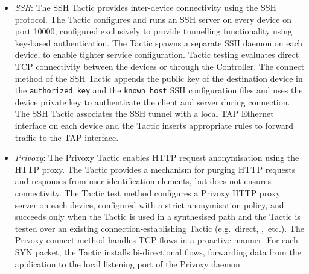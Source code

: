 \begin{itemize}
  \item \emph{SSH}:  The SSH Tactic provides inter-device connectivity using the SSH
    protocol. The Tactic configures and runs an SSH server on every \signpost
    device on port 10000, configured exclusively to provide tunnelling
    functionality using key-based authentication. The Tactic spawns a separate SSH
    daemon on each device, to enable tighter service configuration.  Tactic
    testing evaluates direct TCP connectivity between the devices or through the
    \signpost Controller.  The connect method of the SSH Tactic appends the
    public key of the destination device in the \texttt{authorized\_key} and the
    \texttt{known\_host} SSH configuration files and uses the device private key to
    authenticate the client and server during connection.  The SSH Tactic
    associates the SSH tunnel with a local TAP Ethernet interface on each device
    and the Tactic inserts appropriate \of rules to forward traffic to the TAP
    interface.

\item \emph{Privoxy}: The Privoxy Tactic enables HTTP request anonymisation
    using the  HTTP proxy. The Tactic provides a mechanism
    for purging HTTP requests and responses from user identification elements, but
    does not ensures connectivity. The Tactic test method configures a
    Privoxy HTTP proxy server on each device, configured with a strict
    anonymisation policy, and succeeds only when the Tactic is used in a synthesised
    path and the Tactic is tested over an existing connection-establishing Tactic
    (e.g.~direct, \openvpn,~etc.). The Privoxy connect method handles TCP flows in a
    proactive manner.  For each SYN packet, the Tactic installs bi-directional
    flows, forwarding data from the application to the local listening port of the
    Privoxy daemon.


\end{itemize}
